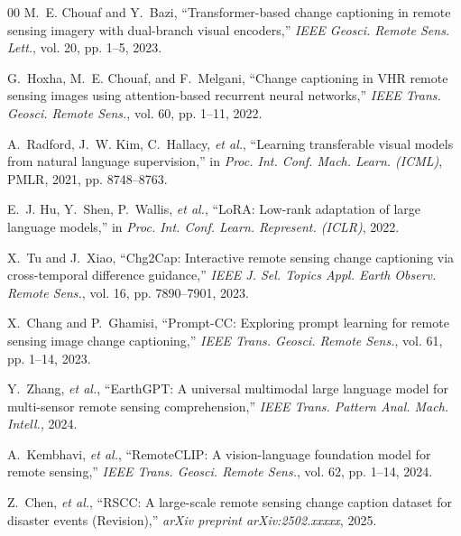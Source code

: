 \documentclass[conference]{IEEEtran}
\begin{document}
\begin{thebibliography}{00}
M.~E. Chouaf and Y.~Bazi, ``Transformer-based change captioning in remote sensing imagery with dual-branch visual encoders,'' \textit{IEEE Geosci. Remote Sens. Lett.}, vol. 20, pp. 1--5, 2023.

G.~Hoxha, M.~E. Chouaf, and F.~Melgani, ``Change captioning in VHR remote sensing images using attention-based recurrent neural networks,'' \textit{IEEE Trans. Geosci. Remote Sens.}, vol. 60, pp. 1--11, 2022.

A.~Radford, J.~W. Kim, C.~Hallacy, \textit{et al.}, ``Learning transferable visual models from natural language supervision,'' in \textit{Proc. Int. Conf. Mach. Learn. (ICML)}, PMLR, 2021, pp. 8748--8763.

E.~J. Hu, Y.~Shen, P.~Wallis, \textit{et al.}, ``LoRA: Low-rank adaptation of large language models,'' in \textit{Proc. Int. Conf. Learn. Represent. (ICLR)}, 2022.

X.~Tu and J.~Xiao, ``Chg2Cap: Interactive remote sensing change captioning via cross-temporal difference guidance,'' \textit{IEEE J. Sel. Topics Appl. Earth Observ. Remote Sens.}, vol. 16, pp. 7890--7901, 2023.

X.~Chang and P.~Ghamisi, ``Prompt-CC: Exploring prompt learning for remote sensing image change captioning,'' \textit{IEEE Trans. Geosci. Remote Sens.}, vol. 61, pp. 1--14, 2023.

Y.~Zhang, \textit{et al.}, ``EarthGPT: A universal multimodal large language model for multi-sensor remote sensing comprehension,'' \textit{IEEE Trans. Pattern Anal. Mach. Intell.}, 2024.

A.~Kembhavi, \textit{et al.}, ``RemoteCLIP: A vision-language foundation model for remote sensing,'' \textit{IEEE Trans. Geosci. Remote Sens.}, vol. 62, pp. 1--14, 2024.

Z.~Chen, \textit{et al.}, ``RSCC: A large-scale remote sensing change caption dataset for disaster events (Revision),'' \textit{arXiv preprint arXiv:2502.xxxxx}, 2025.

\end{thebibliography}
\end{document}
